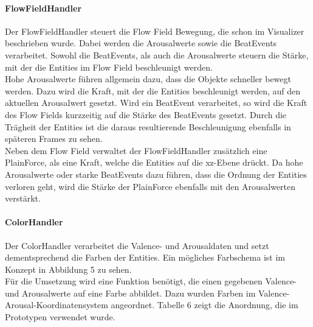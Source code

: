 \documentclass[11pt,a4paper]{article}
\begin{document}
\paragraph{FlowFieldHandler}
Der FlowFieldHandler steuert die Flow Field Bewegung, die schon im Visualizer beschrieben wurde. Dabei werden die Arousalwerte sowie die BeatEvents verarbeitet. Sowohl die BeatEvents, als auch die Arousalwerte steuern die Stärke, mit der die Entities im Flow Field beschleunigt werden.\\
Hohe Arousalwerte führen allgemein dazu, dass die Objekte schneller bewegt werden. Dazu wird die Kraft, mit der die Entities beschleunigt werden, auf den aktuellen Arousalwert gesetzt. Wird ein BeatEvent verarbeitet, so wird die Kraft des Flow Fields kurzzeitig auf die Stärke des BeatEvents gesetzt. Durch die Trägheit der Entities ist die daraus resultierende Beschleunigung ebenfalls in späteren Frames zu sehen.\\
Neben dem Flow Field verwaltet der FlowFieldHandler zusätzlich eine PlainForce, als eine Kraft, welche die Entities auf die xz-Ebene drückt. Da hohe Arousalwerte oder starke BeatEvents dazu führen, dass die Ordnung der Entities verloren geht, wird die Stärke der PlainForce ebenfalls mit den Arousalwerten verstärkt.

\paragraph{ColorHandler}
Der ColorHandler verarbeitet die Valence- und Arousaldaten und setzt dementsprechend die Farben der Entities. Ein mögliches Farbschema ist im Konzept in Abbildung 5 zu sehen.\\
Für die Umsetzung wird eine Funktion benötigt, die einen gegebenen Valence- und Arousalwerte auf eine Farbe abbildet. Dazu wurden Farben im Valence-Arousal-Koordinatensystem angeordnet. Tabelle 6 zeigt die Anordnung, die im Prototypen verwendet wurde.
\end{document}
